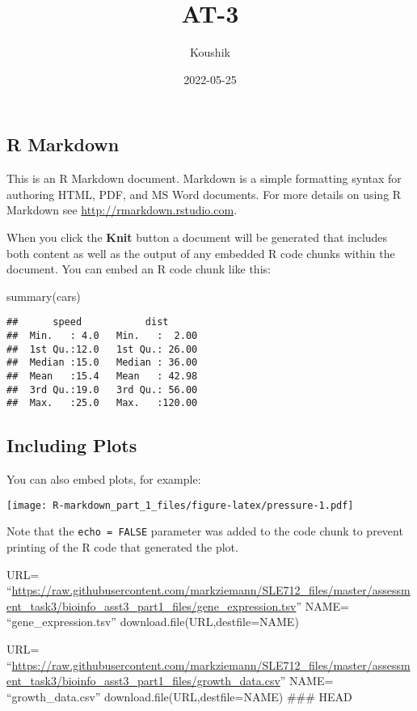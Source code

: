 \documentclass[
]{article}
\title{AT-3}
\author{Koushik}
\date{2022-05-25}
\newenvironment{Shaded}{\begin{snugshade}}{\end{snugshade}}
\newcommand{\FunctionTok}[1]{\textcolor[rgb]{0.00,0.00,0.00}{#1}}
\newcommand{\NormalTok}[1]{#1}
\begin{document}
\maketitle

\hypertarget{r-markdown}{%
\subsection{R Markdown}\label{r-markdown}}

This is an R Markdown document. Markdown is a simple formatting syntax
for authoring HTML, PDF, and MS Word documents. For more details on
using R Markdown see \url{http://rmarkdown.rstudio.com}.

When you click the \textbf{Knit} button a document will be generated
that includes both content as well as the output of any embedded R code
chunks within the document. You can embed an R code chunk like this:

\begin{Shaded}
\begin{Highlighting}[]
\FunctionTok{summary}\NormalTok{(cars)}
\end{Highlighting}
\end{Shaded}

\begin{verbatim}
##      speed           dist       
##  Min.   : 4.0   Min.   :  2.00  
##  1st Qu.:12.0   1st Qu.: 26.00  
##  Median :15.0   Median : 36.00  
##  Mean   :15.4   Mean   : 42.98  
##  3rd Qu.:19.0   3rd Qu.: 56.00  
##  Max.   :25.0   Max.   :120.00
\end{verbatim}

\hypertarget{including-plots}{%
\subsection{Including Plots}\label{including-plots}}

You can also embed plots, for example:

\texttt{[image: R-markdown\_part\_1\_files/figure-latex/pressure-1.pdf]}

Note that the \texttt{echo\ =\ FALSE} parameter was added to the code
chunk to prevent printing of the R code that generated the plot.

URL=
``\url{https://raw.githubusercontent.com/markziemann/SLE712_files/master/assessment_task3/bioinfo_asst3_part1_files/gene_expression.tsv}''
NAME= ``gene\_expression.tsv'' download.file(URL,destfile=NAME)

URL=
``\url{https://raw.githubusercontent.com/markziemann/SLE712_files/master/assessment_task3/bioinfo_asst3_part1_files/growth_data.csv}''
NAME= ``growth\_data.csv'' download.file(URL,destfile=NAME) \#\#\# HEAD
\end{document}
